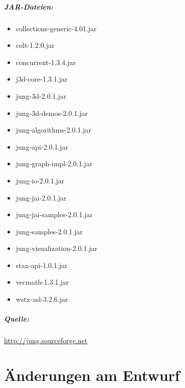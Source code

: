 \documentclass[a4paper]{report}
\begin{document}
\paragraph{JAR-Dateien:}
		\begin{itemize}
		\itemsep -10pt
		\item collections-generic-4.01.jar\\
		\item colt-1.2.0.jar\\
		\item concurrent-1.3.4.jar\\
		\item j3d-core-1.3.1.jar\\
		\item jung-3d-2.0.1.jar\\
		\item jung-3d-demos-2.0.1.jar\\
		\item jung-algorithms-2.0.1.jar\\
		\item jung-api-2.0.1.jar\\
		\item jung-graph-impl-2.0.1.jar\\
		\item jung-io-2.0.1.jar\\
		\item jung-jai-2.0.1.jar\\
		\item jung-jai-samples-2.0.1.jar\\
		\item jung-samples-2.0.1.jar\\
		\item jung-visualization-2.0.1.jar\\
		\item stax-api-1.0.1.jar\\
		\item vecmath-1.3.1.jar\\
		\item wstx-asl-3.2.6.jar\\
		\end{itemize}
\paragraph{Quelle:} \url{http://jung.sourceforge.net}\\

\chapter{Änderungen am Entwurf}
\end{document}

